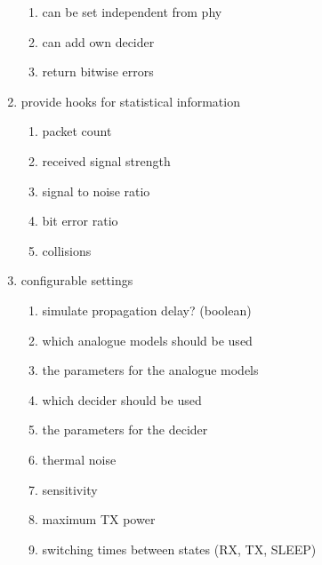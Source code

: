 \begin{enumerate}
\begin{enumerate}
			\item can be set independent from phy \label{deciderIndependent}
			\item can add own decider \label{deciderExtensible}
			\item return bitwise errors \label{deciderBitwise}
			\end{enumerate}
 \item provide hooks for statistical information
	\begin{enumerate}
	\item packet count \label{statPackets}
	\item received signal strength \label{statRSS}
	\item signal to noise ratio \label{statSNR}
	\item bit error ratio \label{statBER}
	\item collisions \label{statColls}
	\end{enumerate}
 \item configurable settings
	\begin{enumerate}
	\item simulate propagation delay? (boolean) \label{confDelay}
	\item which analogue models should be used \label{confAnalogue}
	\item the parameters for the analogue models \label{confAnalogueParam}
	\item which decider should be used \label{confDecider}
	\item the parameters for the decider \label{confDeciderParam}
	\item thermal noise \label{confNoise}
	\item sensitivity \label{confSens}
	\item maximum TX power \label{confMaxTXPower}
	\item switching times between states (RX, TX, SLEEP) \label{confSwitchingTimes}
	\end{enumerate}
\end{enumerate}


